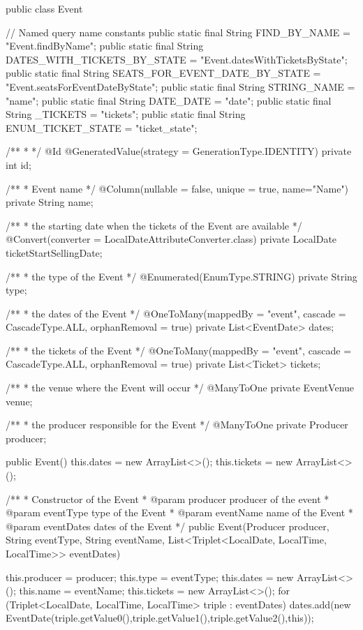 \begin{prompt}
  public class Event {
  
    // Named query name constants
    public static final String FIND_BY_NAME = "Event.findByName";
    public static final String DATES_WITH_TICKETS_BY_STATE = "Event.datesWithTicketsByState";
    public static final String SEATS_FOR_EVENT_DATE_BY_STATE = "Event.seatsForEventDateByState";
    public static final String STRING_NAME = "name";
    public static final String DATE_DATE = "date";
    public static final String _TICKETS = "tickets";
    public static final String ENUM_TICKET_STATE = "ticket_state";
  
    /**
     * 
     */
    @Id @GeneratedValue(strategy = GenerationType.IDENTITY)
    private int id;
  
    /**
     * Event name
     */
    @Column(nullable = false, unique = true, name="Name")
    private String name;
  
    /**
     * the starting date when the tickets of the Event are available
     */
    @Convert(converter = LocalDateAttributeConverter.class)
    private LocalDate ticketStartSellingDate;
  
    /**
     * the type of the Event
     */
    @Enumerated(EnumType.STRING)
    private String type;
  
    /**
     * the dates of the Event
     */
    @OneToMany(mappedBy = "event", cascade = CascadeType.ALL, orphanRemoval = true)
    private List<EventDate> dates;
  
    /**
     * the tickets of the Event
     */
    @OneToMany(mappedBy = "event", cascade = CascadeType.ALL, orphanRemoval = true)
    private List<Ticket> tickets;
  
    /**
     * the venue where the Event will occur 
     */
    @ManyToOne
    private EventVenue venue;
  
    /**
     * the producer responsible for the Event
     */
    @ManyToOne
    private Producer producer;
  
  
    public Event() {
      this.dates = new ArrayList<>();
      this.tickets = new ArrayList<>();
    }
    
    /**
     * Constructor of the Event
     * @param producer producer of the event
     * @param eventType type of the Event
     * @param eventName name of the Event
     * @param eventDates dates of the Event
     */
    public Event(Producer producer, String eventType, String eventName, List<Triplet<LocalDate, LocalTime, LocalTime>> eventDates) {
  
  
      this.producer = producer;
      this.type = eventType;
      this.dates = new ArrayList<>();
      this.name = eventName;
      this.tickets = new ArrayList<>();
      for (Triplet<LocalDate, LocalTime, LocalTime> triple : eventDates) {
        dates.add(new EventDate(triple.getValue0(),triple.getValue1(),triple.getValue2(),this));
      }
    }
    
}
\end{prompt}

